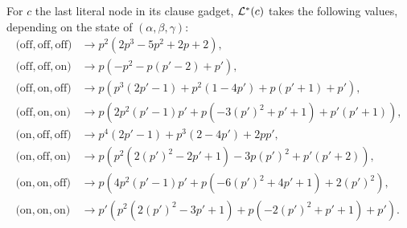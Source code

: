 \begin{lemma}\label{lemma:bayesian_l3_LR}
    For $c$ the last literal node in its clause gadget, $\mathcal{L}^*(c)$ takes the following values, depending on the state of $ \left( \alpha, \beta, \gamma \right) $:
    \begin{align*}
\text{(off},\text{off},\text{off)}&\to            p^2 \left(2 p^3-5 p^2+2 p+2\right), \\
\text{(off},\text{off},\text{on)}&\to            p \left(-p^2-p (p'-2)+p'\right), \\
\text{(off},\text{on},\text{off)}&\to            p \left(p^3 (2 p'-1)+p^2 (1-4 p')+p (p'+1)+p'\right), \\
\text{(off},\text{on},\text{on)}&\to            p \left(2 p^2 (p'-1) p'+p \left(-3 (p')^2+p'+1\right)+p' (p'+1)\right), \\
\text{(on},\text{off},\text{off)}&\to            p^4 (2 p'-1)+p^3 (2-4 p')+2 p p', \\
\text{(on},\text{off},\text{on)}&\to            p \left(p^2 \left(2 (p')^2-2 p'+1\right)-3 p (p')^2+p' (p'+2)\right), \\
\text{(on},\text{on},\text{off)}&\to            p \left(4 p^2 (p'-1) p'+p \left(-6 (p')^2+4 p'+1\right)+2 (p')^2\right), \\
\text{(on},\text{on},\text{on)}&\to            p' \left(p^2 \left(2 (p')^2-3 p'+1\right)+p \left(-2 (p')^2+p'+1\right)+p'\right).
    \end{align*}
\end{lemma}

